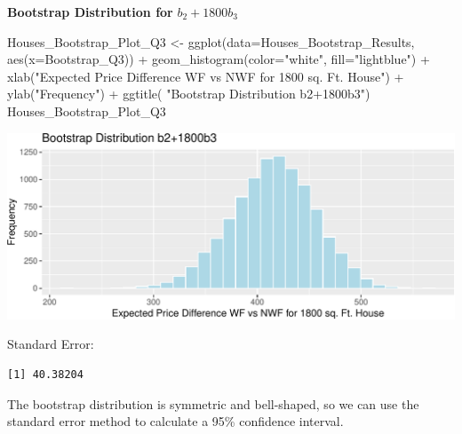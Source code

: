 \documentclass[
  letterpaper,
  DIV=11,
  numbers=noendperiod]{scrreprt}
\newenvironment{Shaded}{\begin{snugshade}}{\end{snugshade}}
\newcommand{\AttributeTok}[1]{\textcolor[rgb]{0.40,0.45,0.13}{#1}}
\newcommand{\FunctionTok}[1]{\textcolor[rgb]{0.28,0.35,0.67}{#1}}
\newcommand{\NormalTok}[1]{\textcolor[rgb]{0.00,0.23,0.31}{#1}}
\newcommand{\OtherTok}[1]{\textcolor[rgb]{0.00,0.23,0.31}{#1}}
\newcommand{\SpecialCharTok}[1]{\textcolor[rgb]{0.37,0.37,0.37}{#1}}
\newcommand{\StringTok}[1]{\textcolor[rgb]{0.13,0.47,0.30}{#1}}
\begin{document}
\textbf{Bootstrap Distribution for} \(b_2 + 1800b_3\)

\begin{Shaded}
\begin{Highlighting}[]
\NormalTok{Houses\_Bootstrap\_Plot\_Q3 }\OtherTok{\textless{}{-}} \FunctionTok{ggplot}\NormalTok{(}\AttributeTok{data=}\NormalTok{Houses\_Bootstrap\_Results, }
                                   \FunctionTok{aes}\NormalTok{(}\AttributeTok{x=}\NormalTok{Bootstrap\_Q3)) }\SpecialCharTok{+}  
  \FunctionTok{geom\_histogram}\NormalTok{(}\AttributeTok{color=}\StringTok{"white"}\NormalTok{, }\AttributeTok{fill=}\StringTok{"lightblue"}\NormalTok{) }\SpecialCharTok{+} 
  \FunctionTok{xlab}\NormalTok{(}\StringTok{"Expected Price Difference WF vs NWF for 1800 sq. Ft. House"}\NormalTok{) }\SpecialCharTok{+} \FunctionTok{ylab}\NormalTok{(}\StringTok{"Frequency"}\NormalTok{) }\SpecialCharTok{+}
  \FunctionTok{ggtitle}\NormalTok{( }\StringTok{"Bootstrap Distribution b2+1800b3"}\NormalTok{) }
\NormalTok{Houses\_Bootstrap\_Plot\_Q3}
\end{Highlighting}
\end{Shaded}

\includegraphics{Ch3_files/figure-pdf/unnamed-chunk-168-1.pdf}

Standard Error:

\begin{Shaded}
\end{Shaded}

\begin{verbatim}
[1] 40.38204
\end{verbatim}

The bootstrap distribution is symmetric and bell-shaped, so we can use
the standard error method to calculate a 95\% confidence interval.
\end{document}
